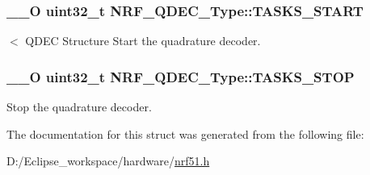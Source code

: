 \subsubsection[{T\+A\+S\+K\+S\+\_\+\+S\+T\+A\+R\+T}]{\setlength{\rightskip}{0pt plus 5cm}\+\_\+\+\_\+\+O uint32\+\_\+t N\+R\+F\+\_\+\+Q\+D\+E\+C\+\_\+\+Type\+::\+T\+A\+S\+K\+S\+\_\+\+S\+T\+A\+R\+T}\label{struct_n_r_f___q_d_e_c___type_af0070d9ac38001ecb1a8c3712a8a65fc}
$<$ Q\+D\+E\+C Structure Start the quadrature decoder. \hypertarget{struct_n_r_f___q_d_e_c___type_a4fe0d92f07c4b2e14b4f83f53326f570}{}
\subsubsection[{T\+A\+S\+K\+S\+\_\+\+S\+T\+O\+P}]{\setlength{\rightskip}{0pt plus 5cm}\+\_\+\+\_\+\+O uint32\+\_\+t N\+R\+F\+\_\+\+Q\+D\+E\+C\+\_\+\+Type\+::\+T\+A\+S\+K\+S\+\_\+\+S\+T\+O\+P}\label{struct_n_r_f___q_d_e_c___type_a4fe0d92f07c4b2e14b4f83f53326f570}
Stop the quadrature decoder. 

The documentation for this struct was generated from the following file\+:\begin{DoxyCompactItemize}
\item 
D\+:/\+Eclipse\+\_\+workspace/hardware/\hyperlink{nrf51_8h}{nrf51.\+h}\end{DoxyCompactItemize}
